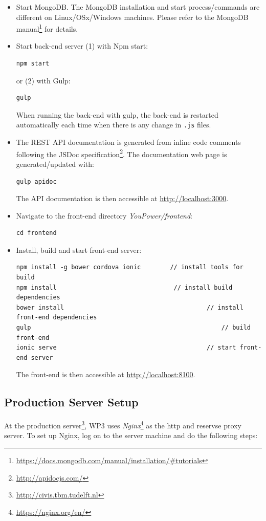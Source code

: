 \begin{itemize}
\item Start MongoDB. The MongoDB installation and start process/commands are different on Linux/OSx/Windows machines. Please refer to the MongoDB manual\footnote{\url{https://docs.mongodb.com/manual/installation/\#tutorials}} for details.  

\item Start back-end server (1) with Npm start: 
\begin{lstlisting}
npm start
\end{lstlisting}
or (2) with Gulp: 
\begin{lstlisting}
gulp
\end{lstlisting}
When running the back-end with gulp, the back-end is restarted automatically each time when there is any change in \texttt{\small *.js} files. 

\item The REST API documentation is generated from inline code comments following the JSDoc specification\footnote{\url{http://apidocjs.com/}}. The documentation web page is generated/updated with:  
\begin{lstlisting}
gulp apidoc
\end{lstlisting}
The API documentation is then accessible at {\small\url{http://localhost:3000}}.

\item Navigate to the front-end directory \textit{YouPower/frontend}: 
\begin{lstlisting}
cd frontend                      
\end{lstlisting}

\item Install, build and start front-end server: 
\begin{lstlisting}
npm install -g bower cordova ionic        // install tools for build
npm install                          	   // install build dependencies
bower install										// install front-end dependencies
gulp													// build front-end
ionic serve											// start front-end server
\end{lstlisting}
The front-end is then accessible at {\small\url{http://localhost:8100}}.

\end{itemize} 

\subsection{Production Server Setup}

At the production server\footnote{\url{http://civis.tbm.tudelft.nl}}, WP3 uses \textit{Nginx}\footnote{\url{https://nginx.org/en/}} as the http and reservse proxy server. 
To set up Nginx, log on to the server machine and do the following steps: 

